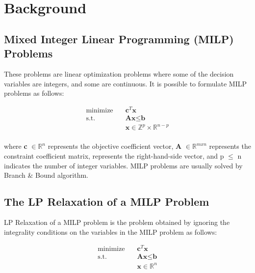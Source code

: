 \section{Background}\label{sec:background}

\subsection{Mixed Integer Linear Programming (MILP) Problems}\label{subsec:mixed-integer-linear-programming-(milp)-problems}


These problems are linear optimization problems where some of the decision variables are integers, and some are continuous.
It is possible to formulate MILP problems as follows:

\begin{equation}
    \begin{aligned}
        \text{minimize} \quad & \textbf{c}^T \textbf{x} \\
        \text{s.t.} \quad & \textbf{A}\textbf{x} \leq \textbf{b} \\
        & \textbf{x} \in \mathbb{Z}^p \times \mathbb{R}^{n-p}\\
    \end{aligned}\label{eq:equation}
\end{equation}


where \textbf{c} \begin{math} \in \mathbb{R}^n \end{math} represents the objective coefficient vector, \textbf{A} \begin{math} \in \mathbb{R}^{mxn} \end{math} represents the constraint coefficient matrix,  represents the right-hand-side vector, and  p \begin{math} \leq \end{math} n indicates the number of integer variables.
MILP problems are usually solved by Branch \& Bound algorithm.


\subsection{The LP Relaxation of a MILP Problem}\label{subsec:the-lp-relaxation-of-a-milp-problem}


LP Relaxation of a MILP problem is the problem obtained by ignoring the integrality conditions on the variables in the MILP problem as follows:

\begin{equation}
    \begin{aligned}
        \text{minimize} \quad & \textbf{c}^T \textbf{x} \\
        \text{s.t.} \quad & \textbf{A}\textbf{x} \leq \textbf{b} \\
        & \textbf{x} \in \mathbb{R}^{n}\\
    \end{aligned}\label{eq:equation}
\end{equation}


